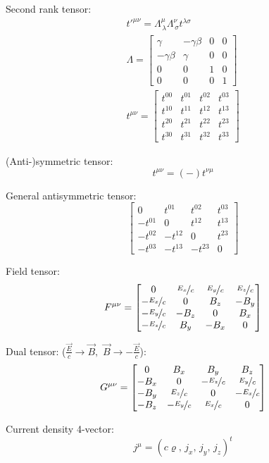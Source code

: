 \documentclass[fontsize=11pt,a4paper]{scrartcl}
\begin{document}
Second rank tensor:
\begin{gather*}
	t'^{\mu\nu}=\Lambda^\mu_{\,\lambda} \Lambda^\nu_{\,\sigma} t^{\lambda\sigma}\\
	\Lambda=\begin{bmatrix}\gamma & -\gamma\beta & 0 & 0\\ -\gamma\beta & \gamma & 0 & 0\\ 0 & 0 & 1 & 0\\ 0 & 0 & 0 &1\end{bmatrix}\\
		t^{\mu\nu}=\begin{bmatrix}t^{00} & t^{01} & t^{02} & t^{03}\\ t^{10} & t^{11} & t^{12} & t^{13}\\ t^{20} & t^{21} & t^{22} & t^{23}\\ t^{30} & t^{31} & t^{32} & t^{33}\end{bmatrix}
\end{gather*}

(Anti-)symmetric tensor:
\[
	t^{\mu\nu}=(-)t^{\nu\mu}
\]

General antisymmetric tensor:
\[
	\begin{bmatrix}0 & t^{01} & t^{02} & t^{03}\\ -t^{01} & 0 & t^{12} & t^{13}\\ -t^{02} & -t^{12} & 0 & t^{23}\\ -t^{03} & -t^{13} & -t^{23} & 0\end{bmatrix}
\]

Field tensor:
\[
	F^{\mu\nu}=\begin{bmatrix}0 & \nicefrac{E_x}{c} & \nicefrac{E_y}{c} & \nicefrac{E_z}{c}\\ -\nicefrac{E_x}{c} & 0 & B_z & -B_y\\ -\nicefrac{E_y}{c} & -B_z & 0  & B_x\\ -\nicefrac{E_z}{c} & B_y & -B_x & 0\end{bmatrix}
\]

Dual tensor: ($\frac{\vec E}{c}\to\vec B,\,\,\vec B\to-\frac{\vec E}{c}$):
\[
	G^{\mu\nu}=\begin{bmatrix}0 & B_x & B_y & B_z\\ -B_x & 0 & -\nicefrac{E_z}{c} & \nicefrac{E_y}{c}\\ -B_y & \nicefrac{E_z}{c} & 0 & -\nicefrac{E_x}{c}\\ -B_z & -\nicefrac{E_y}{c} & \nicefrac{E_x}{c} & 0\end{bmatrix}
\]

Current density 4-vector:
\[
	j^\mu=(c\varrho,\,j_x,\,j_y,\,j_z)^t
\]
\end{document}
